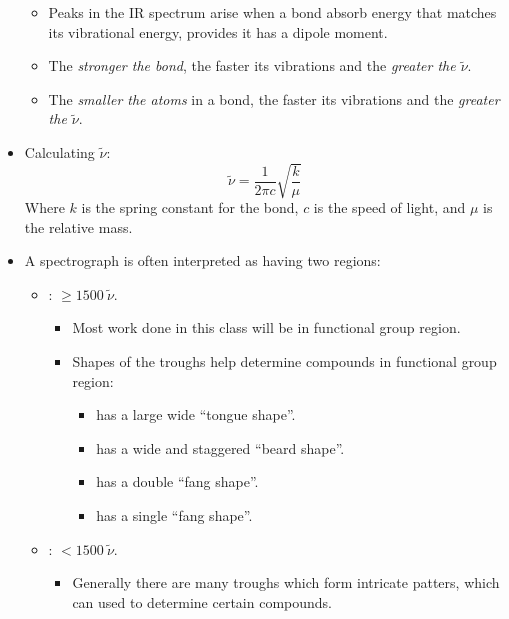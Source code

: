 \begin{itemize}
  \begin{itemize}
    \item Peaks in the IR spectrum arise when a bond absorb energy that matches its vibrational energy, provides it has a dipole moment. 
    \item The \emph{stronger the bond}, the faster its vibrations and the \emph{greater the \(\tilde{\nu} \)}.
    \item The \emph{smaller the atoms} in a bond, the faster its vibrations and the \emph{greater the \(\tilde{\nu} \)}.
  \end{itemize}
  \item Calculating \(\tilde{\nu} \):
  \begin{equation*}
    \tilde{\nu} = \frac{1}{2\pi c}\sqrt{\frac{k}{\mu}}
  \end{equation*}
  Where \(k\) is the spring constant for the bond, \(c\) is the speed of light, and \(\mu \) is the relative mass.
  \item A spectrograph is often interpreted as having two regions:
    \begin{itemize}
      \item {}: \(\geq 1500~\tilde{\nu} \).
      \begin{itemize}
        \item Most work done in this class will be in functional group region.
        \item Shapes of the troughs help determine compounds in functional group region:
          \begin{itemize}
            \item {} has a large wide ``tongue shape''.
            \item {} has a wide and staggered ``beard shape''.
            \item {} has a double ``fang shape''.
            \item {} has a single ``fang shape''.
          \end{itemize}
      \end{itemize}
      \item {}: \(< 1500~\tilde{\nu} \).
        \begin{itemize}
          \item Generally there are many troughs which form intricate patters, which can used to determine certain compounds.
        \end{itemize}
    \end{itemize}

\end{itemize}
